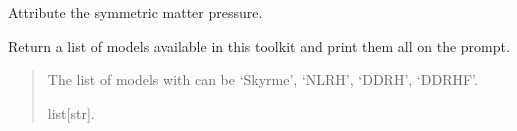 \documentclass[letterpaper,10pt,english]{sphinxmanual}
\begin{document}
\begin{fulllineitems}
\begin{fulllineitems}
\end{fulllineitems}


\begin{fulllineitems}
\label{\detokenize{source/api/setup_pheno:nucleardatapy.setup_pheno.SetupPheno.sm_pre}}
\pysigstartsignatures
{}
\pysigstopsignatures
\sphinxAtStartPar
Attribute the symmetric matter pressure.

\end{fulllineitems}


\end{fulllineitems}


\begin{fulllineitems}
\label{\detokenize{source/api/setup_pheno:nucleardatapy.setup_pheno.models_pheno}}
\pysigstartsignatures
{}
\pysigstopsignatures
\sphinxAtStartPar
Return a list of models available in this toolkit and print them all on the prompt.
\begin{quote}\begin{description}
\sphinxAtStartPar
The list of models with can be ‘Skyrme’, ‘NLRH’, ‘DDRH’, ‘DDRHF’.

\sphinxAtStartPar
list{[}str{]}.

\end{description}\end{quote}

\end{fulllineitems}

\end{document}
